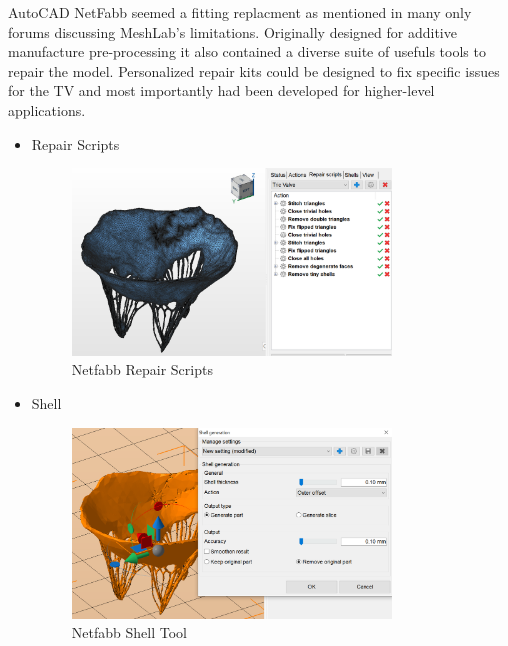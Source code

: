 AutoCAD NetFabb seemed a fitting replacment as mentioned in many only forums discussing MeshLab's limitations. Originally designed for additive manufacture pre-processing it also contained a diverse suite of usefuls tools to repair the model. Personalized repair kits could be designed to fix specific issues for the \gls{TV} and most importantly had been developed for higher-level applications.
\begin{itemize}
    \item Repair Scripts
          \begin{figure}[H]
              \centering
              \includegraphics[width=0.8\textwidth]{figures/NetFabbRepair.png}
              \caption{Netfabb Repair Scripts}
              \label{fig:NetfabbRepair}
          \end{figure}
    \item Shell
          \begin{figure}[H]
              \centering
              \includegraphics[width=0.8\textwidth]{figures/NetFabbShell.png}
              \caption{Netfabb Shell Tool}
              \label{fig:NetfabbShell}
          \end{figure}
\end{itemize}


